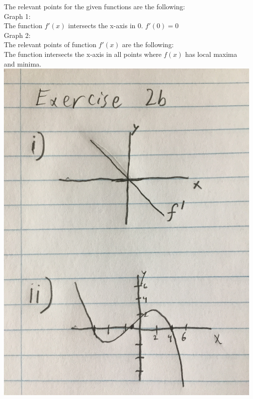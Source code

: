 The relevant points for the given functions are the following:\\
Graph 1:\\
The function $f'(x)$ intersects the x-axis in 0. $f'(0) = 0$\\
Graph 2:\\
The relevant points of function $f'(x)$ are the following:\\
The function intersects the x-axis in all points where $f(x)$ has local maxima and minima.\\
\includegraphics[width=0.5\linewidth]{masd2b.jpg}